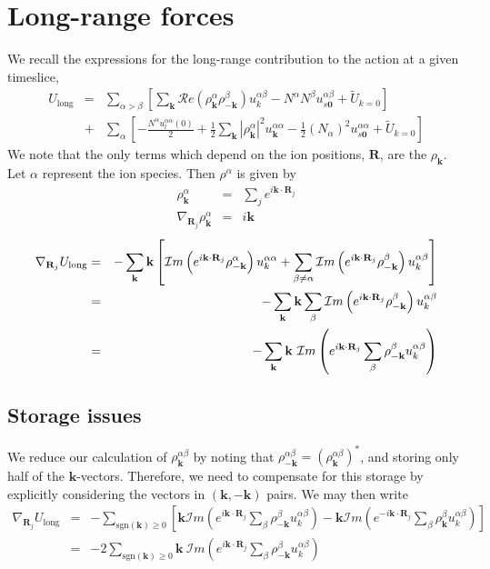 \documentclass{article}
\newcommand{\vR}{\mathbf{R}}
\begin{document}
\section{Long-range forces}
We recall the expressions for the long-range contribution to the
action at a given timeslice,
\newcommand{\vk}{\mathbf{k}}
\begin{eqnarray}
U_\text{long} & = & \sum_{\alpha > \beta} \left[ \sum_\vk \mathcal{R}e\left(\rho_\vk^\alpha
  \rho_{-\vk}^\beta\right) u^{\alpha \beta}_k   -N^\alpha N^\beta
  u^{\alpha \beta}_{s\mathbf{0}}  +\tilde{U}_{k=0} \right] \\
& + & \sum_\alpha \left[ -\frac{N^\alpha u_l^{\alpha \alpha}(0)}{2} + \frac{1}{2} \sum_\vk |\rho_\vk^\alpha|^2 u^{\alpha\alpha}_\vk - \frac{1}{2}\left(N_\alpha\right)^2
  u_{s\mathbf{0}}^{\alpha\alpha} +\tilde{U}_{k=0}\right]  \nonumber 
\end{eqnarray}
We note that the only terms which depend on the ion positions, $\vR$,
are the $\rho_\vk$.  Let $\alpha$ represent the ion species.  Then $\rho^\alpha$ is given by \begin{eqnarray}
\rho^\alpha_\vk & = & \sum_j e^{i\vk \cdot \vR_j} \\
\nabla_{\vR_j} \rho_\vk^\alpha & = & i\vk
\end{eqnarray}
\begin{eqnarray}
\nabla_{\vR_j} U_\text{long} & = &
-\sum_\vk \vk \left[ \mathcal{I}m \left(\rule{0.0cm}{0.35cm}e^{i\vk\cdot\vR_j}\rho_{-\vk}^\alpha\right)u^{\alpha
    \alpha}_k +\sum_{\beta \neq \alpha} \mathcal{I}m\left(
e^{i\vk\cdot\vR_j}\rho^\beta_{-\vk}\right) u_k^{\alpha\beta} \right] \\
& = & -\sum_\vk \vk \sum_\beta \mathcal{I}m
\left(e^{i\vk\cdot\vR_j}\rho_{-\vk}^\beta\right) u^{\alpha\beta}_k \\
& = & - \sum_\vk \vk \ \mathcal{I}m \left( e^{i\vk\cdot\vR_j} \sum_\beta
\rho_{-\vk}^\beta u^{\alpha\beta}_k \right)
\end{eqnarray}

\subsection{Storage issues}
We reduce our calculation of $\rho^{\alpha\beta}_\vk$ by noting that
$\rho_{-\vk}^{\alpha \beta} = \left( \rho_\vk^{\alpha
  \beta}\right)^*$, and storing only half of the $\vk$-vectors.
Therefore, we need to compensate for this storage by explicitly
considering the vectors in $(\vk,-\vk)$ pairs.  We may then write
\begin{eqnarray}
\nabla_{\vR_j} U_\text{long} & = & 
-\sum_{\text{sgn}(\vk)\ge 0} \left[\vk \mathcal{I}m 
\left( e^{i\vk\cdot\vR_j} \sum_\beta \rho_{-\vk}^\beta
u_k^{\alpha\beta}\right) - \vk \mathcal{I}m 
\left(
e^{-i\vk\cdot\vR_j} \sum_\beta \rho_{\vk}^\beta
u_k^{\alpha\beta}\right) 
\right] \nonumber \\
& = & -2 \sum_{\text{sgn}(\vk)\ge 0} \vk \ \mathcal{I}m
\left( e^{i\vk\cdot\vR_j} \sum_\beta \rho^\beta_{-\vk}
u_k^{\alpha\beta} \right)
\end{eqnarray}
\end{document}
